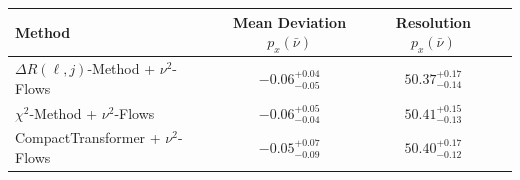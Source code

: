     \begin{tabular}{lccc}
        \toprule
        Method & Mean Deviation $p_{x}(\bar{\nu})$ & Resolution $p_{x}(\bar{\nu})$ \\
        \midrule
        $\Delta R(\ell,j)$-Method + $\nu^2$-Flows & $-0.06^{+0.04}_{-0.05}$ & $50.37^{+0.17}_{-0.14}$ \\
        $\chi^2$-Method + $\nu^2$-Flows & $-0.06^{+0.05}_{-0.04}$ & $50.41^{+0.15}_{-0.13}$ \\
        CompactTransformer + $\nu^2$-Flows & $-0.05^{+0.07}_{-0.09}$ & $50.40^{+0.17}_{-0.12}$ \\
        \bottomrule
    \end{tabular}